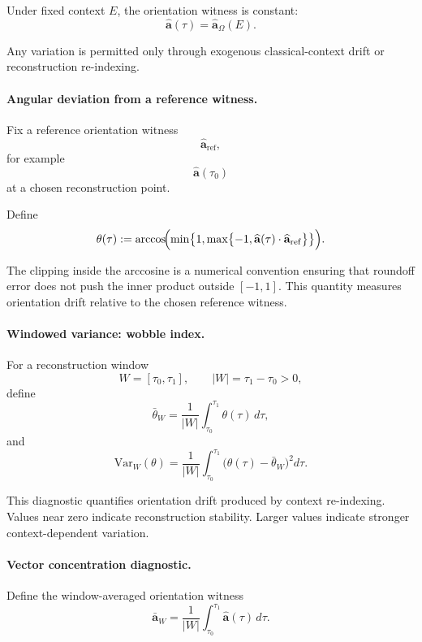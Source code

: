 \documentclass[aps,prx,onecolumn,11pt]{revtex4-2}
\theoremstyle{plain}
\theoremstyle{definition}
\theoremstyle{remark}
\begin{document}
Under fixed context \(E\), the orientation witness is constant:
\[
\widehat{\mathbf a}(\tau)
=
\widehat{\mathbf a}_{\Omega}(E).
\]

Any variation is permitted only through exogenous classical-context
drift or reconstruction re-indexing.

\paragraph{Angular deviation from a reference witness.}

Fix a reference orientation witness
\[
\widehat{\mathbf a}_{\mathrm{ref}},
\]
for example
\[
\widehat{\mathbf a}(\tau_0)
\]
at a chosen reconstruction point.

Define
\begin{equation}
\theta(\tau)
:=
\arccos
\!\Bigl(
\min
\bigl\{
1,
\max
\bigl\{
-1,
\widehat{\mathbf a}(\tau)
\cdot
\widehat{\mathbf a}_{\mathrm{ref}}
\bigr\}
\bigr\}
\Bigr).
\label{eq:toy_axis_angle}
\end{equation}

The clipping inside the arccosine is a numerical convention ensuring
that roundoff error does not push the inner product outside
\([-1,1]\). This quantity measures orientation drift relative to the
chosen reference witness.

\paragraph{Windowed variance: wobble index.}

For a reconstruction window
\[
W=[\tau_0,\tau_1],
\qquad
|W|=\tau_1-\tau_0>0,
\]
define
\[
\bar{\theta}_W
=
\frac{1}{|W|}
\int_{\tau_0}^{\tau_1}
\theta(\tau)\,d\tau,
\]
and
\begin{equation}
\mathrm{Var}_W(\theta)
=
\frac{1}{|W|}
\int_{\tau_0}^{\tau_1}
\bigl(
\theta(\tau)
-
\bar{\theta}_W
\bigr)^2
d\tau.
\label{eq:toy_theta_variance}
\end{equation}

This diagnostic quantifies orientation drift produced by context
re-indexing. Values near zero indicate reconstruction stability. Larger
values indicate stronger context-dependent variation.

\paragraph{Vector concentration diagnostic.}

Define the window-averaged orientation witness
\begin{equation}
\bar{\mathbf a}_W
=
\frac{1}{|W|}
\int_{\tau_0}^{\tau_1}
\widehat{\mathbf a}(\tau)\,d\tau.
\label{eq:toy_axis_mean}
\end{equation}
\end{document}
